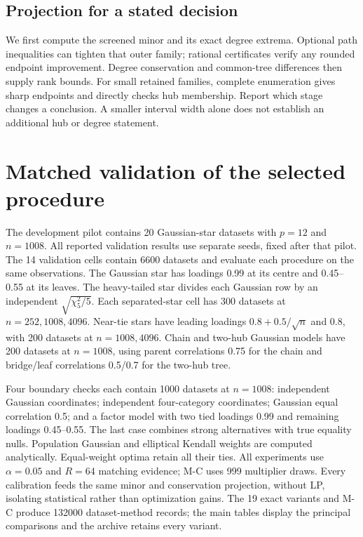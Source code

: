 \documentclass[11pt]{article}
\theoremstyle{plain}
\theoremstyle{definition}\newtheorem{remark}{Remark}\newtheorem{example}{Example}
\begin{document}
\subsection{Projection for a stated decision}\label{sec:decision-workflow}
We first compute the screened minor and its exact degree extrema. Optional path inequalities can tighten that outer family; rational certificates verify any rounded endpoint improvement. Degree conservation and common-tree differences then supply rank bounds. For small retained families, complete enumeration gives sharp endpoints and directly checks hub membership. Report which stage changes a conclusion. A smaller interval width alone does not establish an additional hub or degree statement.


\section{Matched validation of the selected procedure}\label{sec:power-validation}
The development pilot contains 20 Gaussian-star datasets with $p=12$ and $n=1008$. All reported validation results use separate seeds, fixed after that pilot. The 14 validation cells contain 6600 datasets and evaluate each procedure on the same observations. The Gaussian star has loadings 0.99 at its centre and 0.45--0.55 at its leaves. The heavy-tailed star divides each Gaussian row by an independent $\sqrt{\chi_5^2/5}$. Each separated-star cell has 300 datasets at $n=252,1008,4096$. Near-tie stars have leading loadings $0.8+0.5/\sqrt n$ and 0.8, with 200 datasets at $n=1008,4096$. Chain and two-hub Gaussian models have 200 datasets at $n=1008$, using parent correlations 0.75 for the chain and bridge/leaf correlations 0.5/0.7 for the two-hub tree.

Four boundary checks each contain 1000 datasets at $n=1008$: independent Gaussian coordinates; independent four-category coordinates; Gaussian equal correlation 0.5; and a factor model with two tied loadings 0.99 and remaining loadings 0.45--0.55. The last case combines strong alternatives with true equality nulls. Population Gaussian and elliptical Kendall weights are computed analytically. Equal-weight optima retain all their ties. All experiments use $\alpha=0.05$ and $R=64$ matching evidence; M-C uses 999 multiplier draws. Every calibration feeds the same minor and conservation projection, without LP, isolating statistical rather than optimization gains. The 19 exact variants and M-C produce 132000 dataset-method records; the main tables display the principal comparisons and the archive retains every variant.
\end{document}
